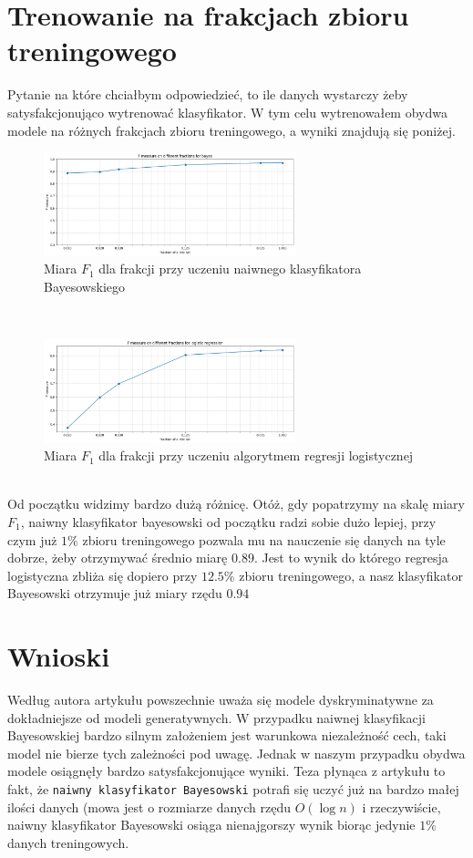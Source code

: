 \documentclass[polish,12pt,a4paper]{extarticle}
\begin{document}
\section*{Trenowanie na frakcjach zbioru treningowego}
Pytanie na które chciałbym odpowiedzieć, to ile danych wystarczy żeby satysfakcjonująco wytrenować klasyfikator. W tym celu wytrenowałem obydwa modele na różnych frakcjach zbioru treningowego, a wyniki znajdują się poniżej.
\begin{figure}[h!]
    \centering
    \includegraphics[width=0.65\textwidth]{img/bayes_frac_better.png}
    \caption{Miara $F_1$ dla frakcji przy uczeniu naiwnego klasyfikatora Bayesowskiego}
\end{figure} \\
\begin{figure}[h!]
    \centering
    \includegraphics[width=0.65\textwidth]{img/logistic_frac.png}
    \caption{Miara $F_1$ dla frakcji przy uczeniu algorytmem regresji logistycznej}
\end{figure} \\
Od początku widzimy bardzo dużą różnicę. Otóż, gdy popatrzymy na skalę miary $F_1$, naiwny klasyfikator bayesowski od początku radzi sobie dużo lepiej, przy czym już $1\%$ zbioru treningowego pozwala mu na nauczenie się danych na tyle dobrze, żeby otrzymywać średnio miarę $0.89$. Jest to wynik do którego regresja logistyczna zbliża się dopiero przy $12.5\%$ zbioru treningowego, a nasz klasyfikator Bayesowski otrzymuje już miary rzędu $0.94$
\section*{Wnioski}
Według autora artykułu powszechnie uważa się modele dyskryminatywne za dokładniejsze od modeli generatywnych. W przypadku naiwnej klasyfikacji Bayesowskiej bardzo silnym założeniem jest warunkowa niezależność cech, taki model nie bierze tych zależności pod uwagę. Jednak w naszym przypadku obydwa modele osiągnęły bardzo satysfakcjonujące wyniki. Teza płynąca z artykułu to fakt, że \texttt{naiwny klasyfikator Bayesowski} potrafi się uczyć już na bardzo małej ilości danych (mowa jest o rozmiarze danych rzędu $O(\log n)$ i rzeczywiście, naiwny klasyfikator Bayesowski osiąga nienajgorszy wynik biorąc jedynie $1\%$ danych treningowych.
\end{document}
